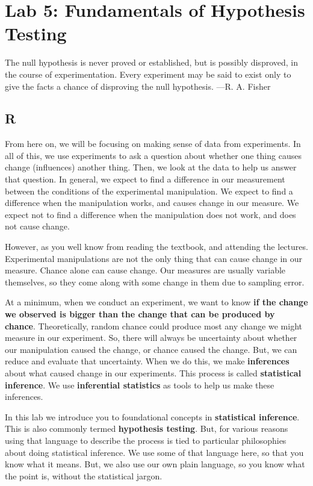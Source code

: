 \documentclass[
]{book}
\begin{document}
\hypertarget{lab-5-fundamentals-of-hypothesis-testing}{%
\chapter{Lab 5: Fundamentals of Hypothesis Testing}\label{lab-5-fundamentals-of-hypothesis-testing}}

{
The null hypothesis is never proved or established, but is possibly disproved, in the course of experimentation. Every experiment may be said to exist only to give the facts a chance of disproving the null hypothesis.
---R. A. Fisher
}

\hypertarget{r-5}{%
\section{R}\label{r-5}}

From here on, we will be focusing on making sense of data from experiments. In all of this, we use experiments to ask a question about whether one thing causes change (influences) another thing. Then, we look at the data to help us answer that question. In general, we expect to find a difference in our measurement between the conditions of the experimental manipulation. We expect to find a difference when the manipulation works, and causes change in our measure. We expect not to find a difference when the manipulation does not work, and does not cause change.

However, as you well know from reading the textbook, and attending the lectures. Experimental manipulations are not the only thing that can cause change in our measure. Chance alone can cause change. Our measures are usually variable themselves, so they come along with some change in them due to sampling error.

At a minimum, when we conduct an experiment, we want to know \textbf{if the change we observed is bigger than the change that can be produced by chance}. Theoretically, random chance could produce most any change we might measure in our experiment. So, there will always be uncertainty about whether our manipulation caused the change, or chance caused the change. But, we can reduce and evaluate that uncertainty. When we do this, we make \textbf{inferences} about what caused change in our experiments. This process is called \textbf{statistical inference}. We use \textbf{inferential statistics} as tools to help us make these inferences.

In this lab we introduce you to foundational concepts in \textbf{statistical inference}. This is also commonly termed \textbf{hypothesis testing}. But, for various reasons using that language to describe the process is tied to particular philosophies about doing statistical inference. We use some of that language here, so that you know what it means. But, we also use our own plain language, so you know what the point is, without the statistical jargon.
\end{document}
